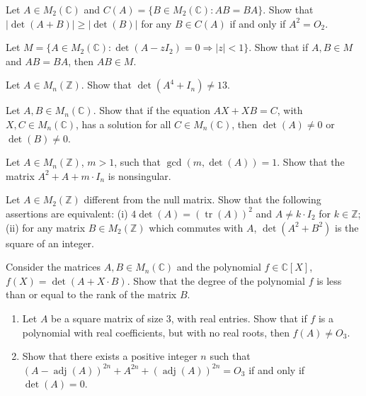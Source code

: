 \documentclass[12pt]{article}
\begin{document}
\begin{problem}
Let $A\in M_2(\mathbb{C})$ and $C(A)=\{B\in M_2(\mathbb{C}): AB=BA\}$. Show that $|\det(A+B)| \ge |\det(B)|$ for any $B\in C(A)$ if and only if $A^2=O_2$.
\end{problem}

\begin{problem}
Let $M = \{A\in M_2(\mathbb{C}) : \det(A-zI_2)=0 \Rightarrow |z|<1\}$. Show that if $A,B\in M$ and $AB=BA$, then $AB\in M$.
\end{problem}

\begin{problem}
Let $A\in M_n(\mathbb{Z})$. Show that $\det(A^4+I_n) \ne 13$.
\end{problem}

\begin{problem}
Let $A,B\in M_n(\mathbb{C})$. Show that if the equation $AX+XB=C$, with $X,C\in M_n(\mathbb{C})$, has a solution for all $C\in M_n(\mathbb{C})$, then $\det(A)\ne 0$ or $\det(B)\ne 0$.
\end{problem}

\begin{problem}
Let $A\in M_n(\mathbb{Z})$, $m>1$, such that $\gcd(m,\det(A))=1$. Show that the matrix $A^2+A+m\cdot I_n$ is nonsingular.
\end{problem}

\begin{problem}
Let $A\in M_2(\mathbb{Z})$ different from the null matrix. Show that the following assertions are equivalent: (i) $4\det(A)=(\operatorname{tr}(A))^2$ and $A\ne k\cdot I_2$ for $k\in\mathbb{Z}$; (ii) for any matrix $B\in M_2(\mathbb{Z})$ which commutes with $A$, $\det(A^2+B^2)$ is the square of an integer.
\end{problem}

\begin{problem}
Consider the matrices $A,B\in M_n(\mathbb{C})$ and the polynomial $f\in\mathbb{C}[X]$, $f(X)=\det(A+X\cdot B)$. Show that the degree of the polynomial $f$ is less than or equal to the rank of the matrix $B$.
\end{problem}

\begin{problem}
\begin{enumerate}[label=(\alph*)]
\item Let $A$ be a square matrix of size $3$, with real entries. Show that if $f$ is a polynomial with real coefficients, but with no real roots, then $f(A)\ne O_3$.
\item Show that there exists a positive integer $n$ such that $(A-\operatorname{adj}(A))^{2n} + A^{2n} + (\operatorname{adj}(A))^{2n} = O_3$ if and only if $\det(A)=0$.
\end{enumerate}
\end{problem}
\end{document}
